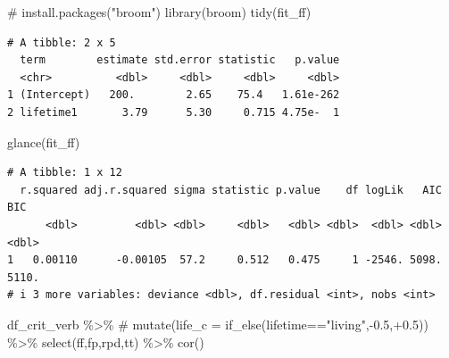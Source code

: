 \documentclass[
  letterpaper,
  DIV=11,
  numbers=noendperiod]{scrartcl}
\newenvironment{Shaded}{\begin{snugshade}}{\end{snugshade}}
\newcommand{\CommentTok}[1]{\textcolor[rgb]{0.37,0.37,0.37}{#1}}
\newcommand{\FunctionTok}[1]{\textcolor[rgb]{0.28,0.35,0.67}{#1}}
\newcommand{\NormalTok}[1]{\textcolor[rgb]{0.00,0.23,0.31}{#1}}
\newcommand{\SpecialCharTok}[1]{\textcolor[rgb]{0.37,0.37,0.37}{#1}}
\begin{document}
\begin{tcolorbox}[enhanced jigsaw, leftrule=.75mm, bottomrule=.15mm, breakable, left=2mm, colback=white, bottomtitle=1mm, colbacktitle=quarto-callout-tip-color!10!white, opacitybacktitle=0.6, titlerule=0mm, colframe=quarto-callout-tip-color-frame, toprule=.15mm, rightrule=.15mm, arc=.35mm, opacityback=0, toptitle=1mm, title=\textcolor{quarto-callout-tip-color}{\faLightbulb}\hspace{0.5em}{\texttt{broom} package for tidy model summaries}, coltitle=black]

\begin{Shaded}
\begin{Highlighting}[]
\CommentTok{\# install.packages("broom")}
\FunctionTok{library}\NormalTok{(broom)}
\FunctionTok{tidy}\NormalTok{(fit\_ff)}
\end{Highlighting}
\end{Shaded}

\begin{verbatim}
# A tibble: 2 x 5
  term        estimate std.error statistic   p.value
  <chr>          <dbl>     <dbl>     <dbl>     <dbl>
1 (Intercept)   200.        2.65    75.4   1.61e-262
2 lifetime1       3.79      5.30     0.715 4.75e-  1
\end{verbatim}

\begin{Shaded}
\begin{Highlighting}[]
\FunctionTok{glance}\NormalTok{(fit\_ff)}
\end{Highlighting}
\end{Shaded}

\begin{verbatim}
# A tibble: 1 x 12
  r.squared adj.r.squared sigma statistic p.value    df logLik   AIC   BIC
      <dbl>         <dbl> <dbl>     <dbl>   <dbl> <dbl>  <dbl> <dbl> <dbl>
1   0.00110      -0.00105  57.2     0.512   0.475     1 -2546. 5098. 5110.
# i 3 more variables: deviance <dbl>, df.residual <int>, nobs <int>
\end{verbatim}

\begin{Shaded}
\begin{Highlighting}[]
\NormalTok{df\_crit\_verb }\SpecialCharTok{\%\textgreater{}\%}
  \CommentTok{\# mutate(life\_c = if\_else(lifetime=="living",{-}0.5,+0.5)) \%\textgreater{}\%}
  \FunctionTok{select}\NormalTok{(ff,fp,rpd,tt) }\SpecialCharTok{\%\textgreater{}\%}
  \FunctionTok{cor}\NormalTok{()}
\end{Highlighting}
\end{Shaded}


\end{tcolorbox}
\end{document}
